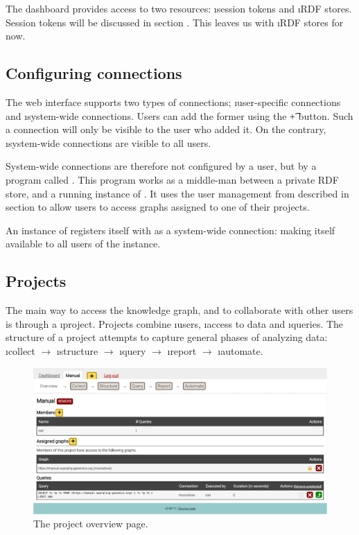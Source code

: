   The dashboard provides access to two resources: \i{session tokens}
  and \i{RDF stores}.  Session tokens will be discussed in section
  .  This leaves us with \i{RDF stores} for now.

\subsection{Configuring connections}
\label{sec:configure-connections}

  The web interface supports two types of connections; \i{user-specific
    connections} and \i{system-wide connections}.  Users can add the
  former using the \t{+} button.  Such a connection will only be visible
  to the user who added it.  On the contrary, \i{system-wide connections}
  are visible to all users.

  System-wide connections are therefore not configured by a user, but by a
  program called .  This program works as a middle-man
  between a private RDF store, and a running instance of .  It
  uses the user management from  described in section
   to allow users to access graphs assigned to one
  of their projects.

  An instance of  registers itself with
   as a system-wide connection: making itself available to
  all users of the  instance.

\subsection{Projects}
\label{sec:web-projects}

  The main way to access the knowledge graph, and to collaborate with other
  users is through a \i{project}.  Projects combine \i{users},
  \i{access to data} and \i{queries}.  The structure of a project
  attempts to capture general phases of analyzing data: \i{collect}
  $\rightarrow$ \i{structure} $\rightarrow$ \i{query} $\rightarrow$
  \i{report} $\rightarrow$ \i{automate}.

  \begin{figure}[H]
    \begin{center}
      \includegraphics[width=1.0\textwidth]{figures/sg-web-project-details.pdf}
    \end{center}
    \caption{The project overview page.}
    \label{fig:web-project-overview}
  \end{figure}


